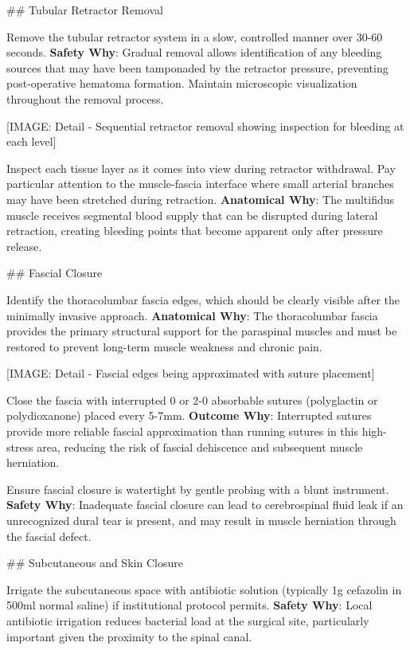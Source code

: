 \documentclass[12pt,a4paper]{article}
\begin{document}
\#\# Tubular Retractor Removal

Remove the tubular retractor system in a slow, controlled manner over 30-60 seconds. \textbf{Safety Why}: Gradual removal allows identification of any bleeding sources that may have been tamponaded by the retractor pressure, preventing post-operative hematoma formation. Maintain microscopic visualization throughout the removal process.

[IMAGE: Detail - Sequential retractor removal showing inspection for bleeding at each level]

Inspect each tissue layer as it comes into view during retractor withdrawal. Pay particular attention to the muscle-fascia interface where small arterial branches may have been stretched during retraction. \textbf{Anatomical Why}: The multifidus muscle receives segmental blood supply that can be disrupted during lateral retraction, creating bleeding points that become apparent only after pressure release.

\#\# Fascial Closure

Identify the thoracolumbar fascia edges, which should be clearly visible after the minimally invasive approach. \textbf{Anatomical Why}: The thoracolumbar fascia provides the primary structural support for the paraspinal muscles and must be restored to prevent long-term muscle weakness and chronic pain.

[IMAGE: Detail - Fascial edges being approximated with suture placement]

Close the fascia with interrupted 0 or 2-0 absorbable sutures (polyglactin or polydioxanone) placed every 5-7mm. \textbf{Outcome Why}: Interrupted sutures provide more reliable fascial approximation than running sutures in this high-stress area, reducing the risk of fascial dehiscence and subsequent muscle herniation.

Ensure fascial closure is watertight by gentle probing with a blunt instrument. \textbf{Safety Why}: Inadequate fascial closure can lead to cerebrospinal fluid leak if an unrecognized dural tear is present, and may result in muscle herniation through the fascial defect.

\#\# Subcutaneous and Skin Closure

Irrigate the subcutaneous space with antibiotic solution (typically 1g cefazolin in 500ml normal saline) if institutional protocol permits. \textbf{Safety Why}: Local antibiotic irrigation reduces bacterial load at the surgical site, particularly important given the proximity to the spinal canal.
\end{document}
